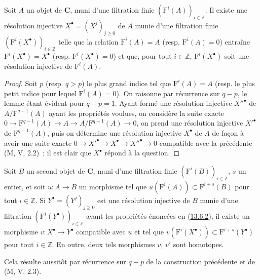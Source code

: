 \begin{lemma}[13.6.2]
\label{0.13.6.2-fr}
Soit $A$ un objet de $\boldsymbol{C}$, muni d'une filtration \textup{finie}
$(\mathrm F^i(A))_{i\in\mathbb Z}$. Il existe une résolution injective
$X^\bullet=(X^j)_{j\geq0}$ de $A$ munie d'une filtration finie
$(\mathrm F^i(X^\bullet))_{i\in\mathbb Z}$ telle que la relation
$\mathrm F^i(A)=A$ \textup{(resp. $\mathrm F^i(A)=0$)} entraîne
$\mathrm F^i(X^\bullet)=X^\bullet$ \textup{(resp. $\mathrm F^i(X^\bullet)=0$)} et
que, pour tout $i\in\mathbb Z$, $\mathrm F^i(X^\bullet)$ soit une
résolution injective de $\mathrm F^i(A)$.
\end{lemma}
\begin{proof}
Soit $p$ (resp. $q>p$) le plus grand indice tel que
$\mathrm F^i(A)=A$ (resp. le plus petit indice pour lequel
$\mathrm F^i(A)=0$). On raisonne par récurrence sur $q-p$, le lemme étant
évident pour $q-p=1$. Ayant formé une résolution injective
${X''}^\bullet$ de $A/\mathrm F^{q-1}(A)$ ayant les propriétés voulues,
on considère la suite exacte
$0\to\mathrm F^{q-1}(A)\to A\to A/\mathrm F^{q-1}(A)\to0$,
on prend une résolution injective ${X'}^\bullet$ de
$\mathrm F^{q-1}(A)$, puis on détermine une résolution injective
$X^\bullet$ de $A$ de façon à avoir une suite exacte
$0\to {X'}^\bullet\to X^\bullet\to {X''}^\bullet\to0$
compatible avec la précédente (M, V, 2.2)~; il est clair que
$X^\bullet$ répond à la question.
\end{proof}

\begin{corollary}[13.6.3]
\label{0.13.6.3-fr}
Soit $B$ un second objet de $\boldsymbol{C}$, muni d'une filtration finie
$(\mathrm F^i(B))_{i\in\mathbb Z}$, $s$ un entier, et soit $u:A\to B$
un morphisme tel que $u(\mathrm F^i(A))\subset\mathrm F^{i+s}(B)$ pour
tout $i\in\mathbb Z$. Si $Y^\bullet=(Y^j)_{j\geq0}$ est une résolution
injective de $B$ munie d'une filtration
$(\mathrm F^i(Y^\bullet))_{i\in\mathbb Z}$ ayant les propriétés énoncées
en \textup{(\hyperref[0.13.6.2-fr]{13.6.2})}, il existe un morphisme
$v:X^\bullet\to Y^\bullet$ compatible avec $u$ et tel que
$v(\mathrm F^i(X^\bullet))\subset\mathrm F^{i+s}(Y^\bullet)$ pour tout
$i\in\mathbb Z$. En outre, deux tels morphismes $v$, $v'$ sont
homotopes.
\end{corollary}

Cela résulte aussitôt par récurrence sur $q-p$ de la construction
précédente et de (M, V, 2.3).

